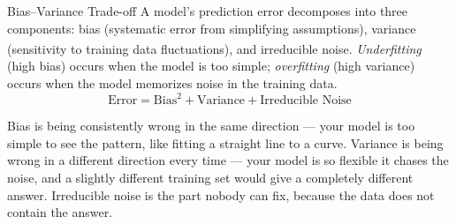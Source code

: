 \begin{v3topic}{Bias--Variance Trade-off}
    A model's prediction error decomposes into three components: bias (systematic error from simplifying assumptions), variance (sensitivity to training data fluctuations), and irreducible noise\textsuperscript{\cite[][pp.~14--25]{iiiCourseMachineLearning}}.
    \emph{Underfitting} (high bias) occurs when the model is too simple; \emph{overfitting} (high variance) occurs when the model memorizes noise in the training data.
\visualseparator
    \begin{equation}
        \text{Error} = \text{Bias}^2 + \text{Variance} + \text{Irreducible Noise}
        \label{eq:ml-bias-variance}
    \end{equation}

\begin{plainlanguage}
Bias is being consistently wrong in the same direction --- your model is too
simple to see the pattern, like fitting a straight line to a curve. Variance is
being wrong in a different direction every time --- your model is so flexible
it chases the noise, and a slightly different training set would give a
completely different answer. Irreducible noise is the part nobody can fix,
because the data does not contain the answer.
\end{plainlanguage}


\end{v3topic}
